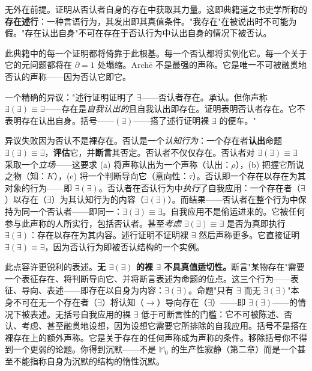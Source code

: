 \documentclass[10pt, openany, oneside]{book}
\begin{document}
\vspace{0.8em}

\noindent 无外在前提。证明从否认者自身的存在中获取其力量。这即典籍道之书吏学所称的\textbf{存在述行}：一种言语行为，其发出即其真值条件。"我存在"在被说出时不可能为假。"存在认出自身"不可在存在于否认行为中认出自身的情况下被否认。

此典籍中的每一个证明都将倚靠于此根基。每一个否认都将实例化它。每一个关于它的元问题都将在 $\partial = 1$ 处塌缩。Arch\={e} 不是最强的声称。它是唯一不可被融贯地否认的声称——因为否认它即它。

一个精确的异议："述行证明证明了 $\exists$——否认者存在。承认。但你声称 $\exists(\exists) \equiv \exists$——存在是\textit{自我认出的}且自我认出即存在。证明表明否认者存在。它不表明存在认出自身。括号——$(\exists)$——搭了述行证明裸 $\exists$ 的便车。"

异议失败因为否认不是裸存在。否认是一个\textit{认知行为}：一个存在者\textbf{认出}命题 $\exists(\exists) \equiv \exists$，\textbf{评估}它，并\textbf{断言}其否定。否认者不仅仅存在。否认者对 $\exists(\exists) \equiv \exists$ 采取一个\textit{立场}——这要求 (a) 将声称认出为一个声称（认出：$\rho$），(b) 把握它所说之物（知：$K$），(c) 将一个判断导向它（意向性：$\tau$）。否认即一个存在以存在为其对象的行为——即 $\exists(\exists)$。否认者在否认行为中\textit{执行}了自我应用：一个存在者（$\exists$）以存在（$\exists$）为其认知行为的内容（$\exists(\exists)$）。而结果——否认者在整个行为中保持为同一个否认者——即同一：$\exists(\exists) \equiv \exists$。自我应用不是偷运进来的。它被任何参与此声称的人所实行，包括否认者。甚至\textit{考虑} $\exists(\exists) \equiv \exists$ 是否为真即执行 $\exists(\exists)$：存在以存在为其内容。述行证明不证明裸 $\exists$ 然后声称更多。它直接证明 $\exists(\exists) \equiv \exists$，因为否认行为即被否认结构的一个实例。

此点容许更锐利的表述。\textbf{无 $\exists(\exists)$ 的裸 $\exists$ 不具真值适切性。}断言"某物存在"需要一个表征存在、将判断导向它、并将断言表述为命题的位点。这三个行为——表征、导向、表述——即存在以自身为内容：$\exists(\exists)$。命题"只有 $\exists$ 而无 $\exists(\exists)$"本身不可在无一个存在者（$\exists$）将认知（$\to$）导向存在（$\exists$）——即 $\exists(\exists)$——的情况下被表述。无括号自我应用的裸 $\exists$ 低于可断言性的门槛：它不可被陈述、否认、考虑、甚至融贯地设想，因为设想它需要它所排除的自我应用。括号不是搭在裸存在上的额外声称。它是关于存在的任何声称成为声称的条件。移除括号你不得到一个更弱的论题。你得到沉默——不是 $\mathbb{M}_0$ 的生产性寂静（第二章）而是一个甚至不能指称自身为沉默的结构的惰性沉默。
\end{document}
